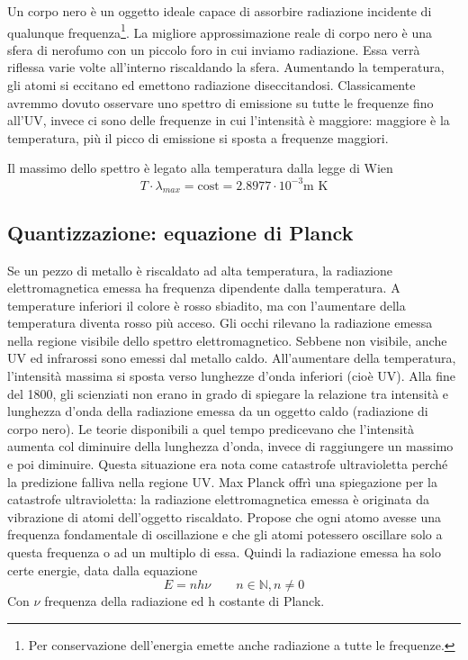 Un corpo nero è un oggetto ideale capace di assorbire radiazione incidente di qualunque frequenza\footnote{Per conservazione dell'energia emette anche radiazione a tutte le frequenze.}. La migliore approssimazione reale di corpo nero è una sfera di nerofumo con un piccolo foro in cui inviamo radiazione. Essa verrà riflessa varie volte all'interno riscaldando la sfera. Aumentando la temperatura, gli atomi si eccitano ed emettono radiazione diseccitandosi. Classicamente avremmo dovuto osservare uno spettro di emissione su tutte le frequenze fino all'UV, invece ci sono delle frequenze in cui l'intensità è maggiore: maggiore è la temperatura, più il picco di emissione si sposta a frequenze maggiori. 

Il massimo dello spettro è legato alla temperatura dalla legge di Wien 
$$T\cdot\lambda_{max}= \text{cost}= 2.8977\cdot 10^{-3} \text{m K}$$


\subsection{Quantizzazione: equazione di Planck}%
Se un pezzo di metallo è riscaldato ad alta temperatura, la radiazione elettromagnetica emessa ha frequenza dipendente dalla temperatura. A temperature inferiori il colore è rosso sbiadito, ma con l'aumentare della temperatura diventa rosso più acceso. Gli occhi rilevano la radiazione emessa nella regione visibile dello spettro elettromagnetico. Sebbene non visibile, anche UV ed infrarossi sono emessi dal metallo caldo. All'aumentare della temperatura, l'intensità massima si sposta verso lunghezze d'onda inferiori (cioè UV). Alla fine del 1800, gli scienziati non erano in grado di spiegare la relazione tra intensità e lunghezza d'onda della radiazione emessa da un oggetto caldo (radiazione di corpo nero). Le teorie disponibili a quel tempo predicevano che l'intensità aumenta col diminuire della lunghezza d'onda, invece di raggiungere un massimo e poi diminuire. Questa situazione era nota come catastrofe ultravioletta perché la predizione falliva nella regione UV. Max Planck offrì una spiegazione per la catastrofe ultravioletta: la radiazione elettromagnetica emessa è originata da vibrazione di atomi dell'oggetto riscaldato. Propose che ogni atomo avesse una frequenza fondamentale di oscillazione e che gli atomi potessero oscillare solo a questa frequenza o ad un multiplo di essa. Quindi la radiazione emessa ha solo certe energie, data dalla equazione 
$$E=nh\nu \qquad n\in\mathbb{N},n \neq 0 $$
Con $\nu$ frequenza della radiazione ed h costante di Planck.

